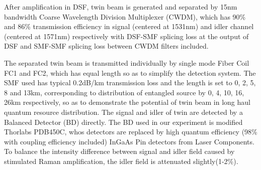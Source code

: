 \documentclass[9pt,twocolumn,twoside]{osajnl}
\begin{document}
After amplification in DSF, twin beam is generated and separated by 15nm bandwidth Coarse Wavelength Division Multiplexer (CWDM), which has 90\% and 86\% transmission efficiency in signal (centered at 1531nm) and idler channel (centered at 1571nm)  respectively with DSF-SMF splicing loss at the output of DSF and SMF-SMF splicing loss between CWDM filters included.

The separated twin beam is transmitted individually by single mode Fiber Coil FC1 and FC2, which has equal length so as to simplify the detection system.
The SMF used has typical 0.2dB/km transmission loss and the length is set to 0, 2, 5, 8 and 13km, corresponding to distribution of entangled source by 0, 4, 10, 16, 26km respectively, so as to demonstrate the potential of twin beam in long haul quantum resource distribution.
The signal and idler of twin are detected by a Balanced Detector (BD) directly. The BD used in our experiment is modified Thorlabs PDB450C, whos detectors are replaced by high quantum efficiency (98\% with coupling efficiency included) InGaAs Pin detectors from Laser Components.
To balance the intensity difference between signal and idler field caused by stimulated Raman amplification, the idler field is attenuated slightly(1-2\%)\cite{guo12}.

\end{document}
